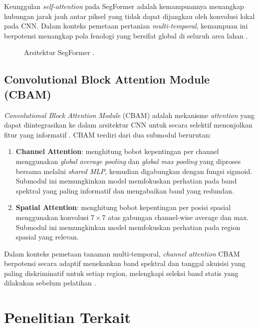 Keunggulan \textit{self-attention} pada SegFormer adalah kemampuannya menangkap hubungan jarak jauh antar piksel yang tidak dapat dijangkau oleh konvolusi lokal pada CNN.
Dalam konteks pemetaan pertanian \textit{multi-temporal}, kemampuan ini berpotensi menangkap pola fenologi yang bersifat global di seluruh area lahan \citep{li2023, wu2025}.

\begin{figure}[H]
    \centering
    \caption{Arsitektur SegFormer \citep{xie2021}.}
    \label{fig:segformer}
\end{figure}

\subsection{Convolutional Block Attention Module (CBAM)}
\textit{Convolutional Block Attention Module} (CBAM) adalah mekanisme \textit{attention} yang dapat diintegrasikan ke dalam arsitektur CNN untuk secara selektif menonjolkan fitur yang informatif \citep{woo2018}.
CBAM terdiri dari dua submodul berurutan:
\begin{enumerate}
    \item \textbf{Channel Attention}: menghitung bobot kepentingan per channel menggunakan \textit{global average pooling} dan \textit{global max pooling} yang diproses bersama melalui \textit{shared MLP}, kemudian digabungkan dengan fungsi sigmoid. Submodul ini memungkinkan model memfokuskan perhatian pada band spektral yang paling informatif dan mengabaikan band yang redundan.
    \item \textbf{Spatial Attention}: menghitung bobot kepentingan per posisi spasial menggunakan konvolusi $7\times7$ atas gabungan channel-wise average dan max. Submodul ini memungkinkan model memfokuskan perhatian pada region spasial yang relevan.
\end{enumerate}

Dalam konteks pemetaan tanaman multi-temporal, \textit{channel attention} CBAM berpotensi secara adaptif menekankan band spektral dan tanggal akuisisi yang paling diskriminatif untuk setiap region, melengkapi seleksi band statis yang dilakukan sebelum pelatihan \citep{hsu2022, gao2023}.

\section{Penelitian Terkait}


